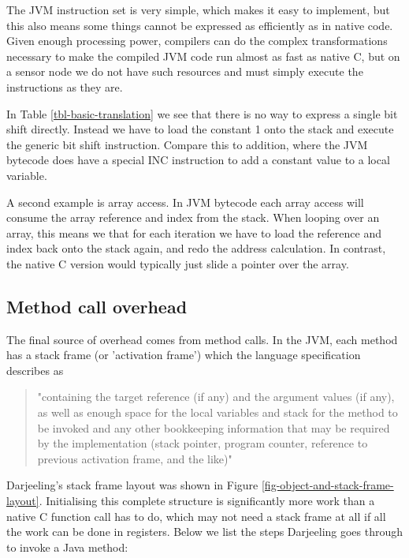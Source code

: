 The JVM instruction set is very simple, which makes it easy to implement, but this also means some things cannot be expressed as efficiently as in native code. Given enough processing power, compilers can do the complex transformations necessary to make the compiled JVM code run almost as fast as native C, but on a sensor node we do not have such resources and must simply execute the instructions as they are.

In Table \ref{tbl-basic-translation} we see that there is no way to express a single bit shift directly. Instead we have to load the constant 1 onto the stack and execute the generic bit shift instruction. Compare this to addition, where the JVM bytecode does have a special INC instruction to add a constant value to a local variable.

A second example is array access. In JVM bytecode each array access will consume the array reference and index from the stack. When looping over an array, this means we that for each iteration we have to load the reference and index back onto the stack again, and redo the address calculation. In contrast, the native C version would typically just slide a pointer over the array.

\subsection{Method call overhead}
\label{sec-overhead-method-call}
The final source of overhead comes from method calls. In the JVM, each method has a stack frame (or 'activation frame') which the language specification describes as
\begin{quotation}
"containing the target reference (if any) and the argument values (if any), as well as enough space for the local variables and stack for the method to be invoked and any other bookkeeping information that may be required by the implementation (stack pointer, program counter, reference to previous activation frame, and the like)" \cite{Gosling:2014}
\end{quotation}

Darjeeling's stack frame layout was shown in Figure \ref{fig-object-and-stack-frame-layout}. Initialising this complete structure is significantly more work than a native C function call has to do, which may not need a stack frame at all if all the work can be done in registers. Below we list the steps Darjeeling goes through to invoke a Java method:

